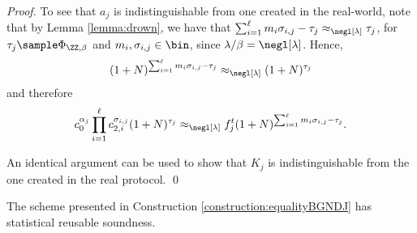 \begin{proof}
To see that $a_{j}$ is indistinguishable from one created in the real-world, note that by Lemma \ref{lemma:drown}, we have that $\sum_{i=1}^\ell m_i\sigma_{i,j}-\tau_{j} \approx_{\negl[\lambda]}\tau_{j}$, for $\tau_{j}\sample  \Phi_{\ZZ,\beta}$ and $m_i,\sigma_{i,j}\in\bin$, since $\lambda/\beta=\negl[\lambda]$. Hence, $$(1+N)^{\sum_{i=1}^\ell m_i\sigma_{i,j}-\tau_{j}} \approx_{\negl[\lambda]}(1+N)^{\tau_{j}}$$ and therefore $$c_0^{\alpha_j}\prod_{i=1}^\ell c_{2,i}^{\sigma_{i,j}}(1+N)^{\tau_{j}}\approx_{\negl[\lambda]} f_{j}^t(1+N)^{\sum_{i=1}^\ell m_i\sigma_{i,j}-\tau_{j}}.$$

An identical argument can be used to show that $K_j$ is indistinguishable from the one created in the real protocol.
\qed
\end{proof}


\begin{lemma}
\label{}
The scheme presented in Construction \ref{construction:equalityBGNDJ} has statistical reusable soundness.
\end{lemma}
